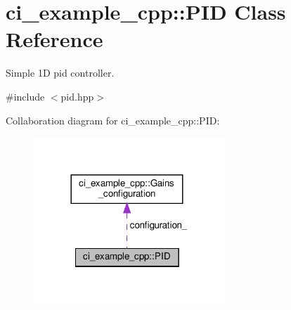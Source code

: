 \hypertarget{classci__example__cpp_1_1PID}{}\section{ci\+\_\+example\+\_\+cpp\+:\+:P\+ID Class Reference}
\label{classci__example__cpp_1_1PID}


Simple 1D pid controller.  




{\ttfamily \#include $<$pid.\+hpp$>$}



Collaboration diagram for ci\+\_\+example\+\_\+cpp\+:\+:P\+ID\+:
\nopagebreak
\begin{figure}[H]
\begin{center}
\leavevmode
\includegraphics[width=204pt]{classci__example__cpp_1_1PID__coll__graph}
\end{center}
\end{figure}
